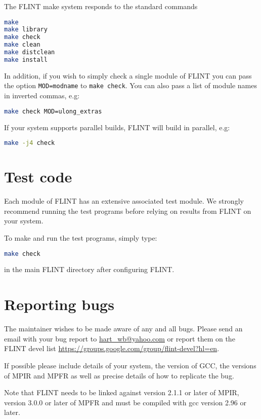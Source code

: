 \documentclass[a4paper,10pt]{book}
\newcommand{\code}{\lstinline}
\begin{document}
The FLINT make system responds to the standard commands
\begin{lstlisting}[language=bash]
make 
make library
make check
make clean
make distclean
make install
\end{lstlisting}

In addition, if you wish to simply check a single module of FLINT you
can pass the option \code{MOD=modname} to \code{make check}. You can 
also pass a list of module names in inverted commas, e.g:

\begin{lstlisting}[language=bash]
make check MOD=ulong_extras
\end{lstlisting}

If your system supports parallel builds, FLINT will build in parallel,
e.g:
\begin{lstlisting}[language=bash]
make -j4 check 
\end{lstlisting}

\chapter{Test code}

Each module of FLINT has an extensive associated test module.  We 
strongly recommend running the test programs before relying on results 
from FLINT on your system. 

To make and run the test programs, simply type:
\begin{lstlisting}[language=bash]
make check
\end{lstlisting}

in the main FLINT directory after configuring FLINT.

\chapter{Reporting bugs}

The maintainer wishes to be made aware of any and all bugs.  Please send an 
email with your bug report to \url{hart_wb@yahoo.com} or report them on the
FLINT devel list \url{https://groups.google.com/group/flint-devel?hl=en}.

If possible please include details of your system, the version of GCC, 
the versions of MPIR and MPFR as well as precise details of how to 
replicate the bug.

Note that FLINT needs to be linked against version 2.1.1 or later of MPIR,
version 3.0.0 or later of MPFR and must be compiled with gcc version 2.96 
or later.  
\end{document}
